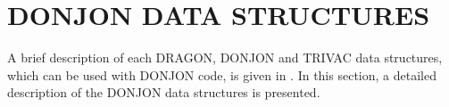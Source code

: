 \section{ DONJON DATA STRUCTURES}\label{sect:structure}

\vskip 0.2cm
\noindent
A brief description of each DRAGON, DONJON and TRIVAC data structures,
which can be used with DONJON code, is given in . In this section,
a detailed description of the DONJON data structures is presented.
\vskip 1.0cm

\vskip 1.0cm

\vskip 1.0cm

\vskip 1.0cm

\vskip 1.0cm

\vskip 1.0cm

\vskip 1.0cm

\vskip 1.0cm

\vskip 1.0cm

\vskip 1.0cm

